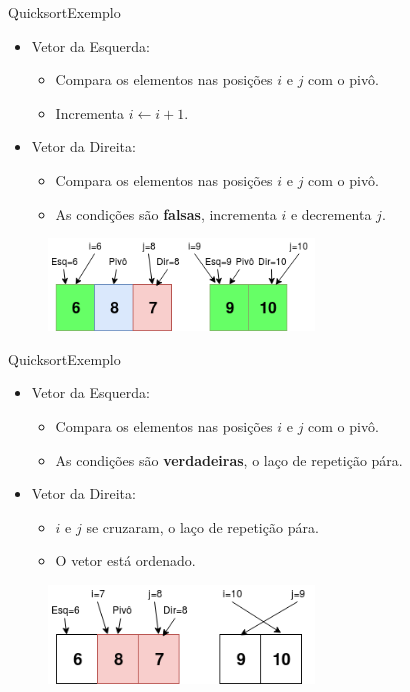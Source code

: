 \documentclass[aspectratio=169]{beamer}
\begin{document}
\begin{frame}{Quicksort}{Exemplo}
\begin{itemize}
 \item Vetor da Esquerda:
\begin{itemize}
 \item Compara os elementos nas posições $i$ e $j$ com o pivô.
 \item Incrementa $i\leftarrow i + 1$.
\end{itemize}
\item Vetor da Direita:
\begin{itemize}
\item Compara os elementos nas posições $i$ e $j$ com o pivô.
\item As condições são {\bf falsas}, incrementa $i$ e decrementa $j$.
\end{itemize}
\end{itemize}

\begin{figure}[!h]
  \centering
  \includegraphics[width=200pt]{imgs/quick/quick38.png}
  \label{fig_quick38}
\end{figure}

\end{frame}



\begin{frame}{Quicksort}{Exemplo}
\begin{itemize}
 \item Vetor da Esquerda:
\begin{itemize}
 \item Compara os elementos nas posições $i$ e $j$ com o pivô.
\item As condições são {\bf verdadeiras}, o laço de repetição pára.
\end{itemize}
\item Vetor da Direita:
\begin{itemize}
\item $i$ e $j$ se cruzaram, o laço de repetição pára.
\item O vetor está ordenado.
\end{itemize}
\end{itemize}

\begin{figure}[!h]
  \centering
  \includegraphics[width=200pt]{imgs/quick/quick39.png}
  \label{fig_quick39}
\end{figure}

\end{frame}
\end{document}

